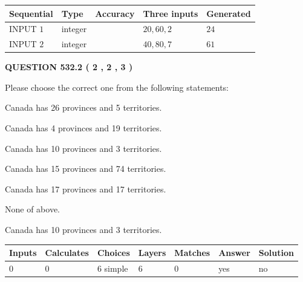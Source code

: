 \documentclass[12pt]{article}
\begin{document}
   
  
  
\noindent\begin{tabular}{|l|l|l|l|l|}
\hline
 Sequential & Type & Accuracy & Three inputs & Generated \\ 
\hline
 
 
  INPUT $  1 $ & integer &  & $
 20
 , 
 60
 , 
 2
 $ & $ 24 $ 
 \\  \hline  
 
 
  INPUT $  2 $ & integer &  & $
 40
 , 
 80
 , 
 7
 $ & $ 61 $ 
 \\  \hline  
 \end{tabular}
   
   
  
\vspace{0.2in}
  
{\textbf{\Large{QUESTION
532.2 
 ( 2 , 2 , 3 )
}}}
  
  
Please choose the correct one from the following statements:
 
 
Canada has  26 provinces and  5 territories.
 
 
Canada has   4 provinces and  19 territories.
 
 
Canada has 10  provinces and 3 territories.
 
 
Canada has  15 provinces and  74 territories.
 
 
Canada has  17 provinces and  17 territories.
 
 
 None of above.
 
 
\noindent{}
 
 
Canada has 10  provinces and 3 territories.
 
 
\noindent{}
 
 
   
   
   
   
\noindent\begin{tabular}{|l|l|l|l|l|l|l|}
 \hline
Inputs & Calculates & Choices & Layers & Matches & Answer & Solution \\ \hline
 0  & 
 0  & 
 6
  simple  
  & 
 6  & 
 0  & 
  yes & 
  no 
  \\ \hline
 \end{tabular}
   
\end{document}
